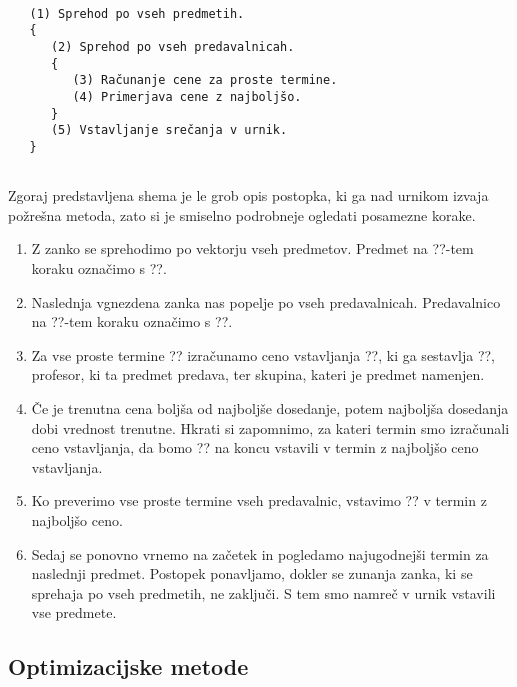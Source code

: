 \documentclass[a4paper, 10pt]{article}
\begin{document}
\begin{verbatim}
   
   (1) Sprehod po vseh predmetih.
   {
      (2) Sprehod po vseh predavalnicah.
      {
         (3) Računanje cene za proste termine.
         (4) Primerjava cene z najboljšo.
      }
      (5) Vstavljanje srečanja v urnik.
   }
   
\end{verbatim}

Zgoraj predstavljena shema je le grob opis postopka, ki ga nad urnikom izvaja požrešna metoda,
zato si je smiselno podrobneje ogledati posamezne korake.

\begin{enumerate}
   
   \item   Z zanko se sprehodimo po vektorju vseh predmetov. Predmet na ??-tem koraku
      označimo s ??.
   
   \item   Naslednja vgnezdena zanka nas popelje po vseh predavalnicah. Predavalnico na
      ??-tem koraku označimo s ??.
   
   \item   Za vse proste termine ?? izračunamo ceno vstavljanja
      ??, ki ga sestavlja ??, profesor, ki ta predmet predava,
      ter skupina, kateri je predmet namenjen.
   
   \item   Če je trenutna cena boljša od najboljše dosedanje, potem najboljša dosedanja
      dobi vrednost trenutne. Hkrati si zapomnimo, za kateri termin smo izračunali ceno
      vstavljanja, da bomo ?? na koncu vstavili v termin z najboljšo
      ceno vstavljanja.
   
   \item   Ko preverimo vse proste termine vseh predavalnic, vstavimo ??
      v termin z najboljšo ceno.
   
   \item   Sedaj se ponovno vrnemo na začetek in pogledamo najugodnejši termin za naslednji
      predmet. Postopek ponavljamo, dokler se zunanja zanka, ki se sprehaja po vseh predmetih,
      ne zaključi. S tem smo namreč v urnik vstavili vse predmete.
   
   
\end{enumerate}
\subsection{Optimizacijske metode}
\end{document}
